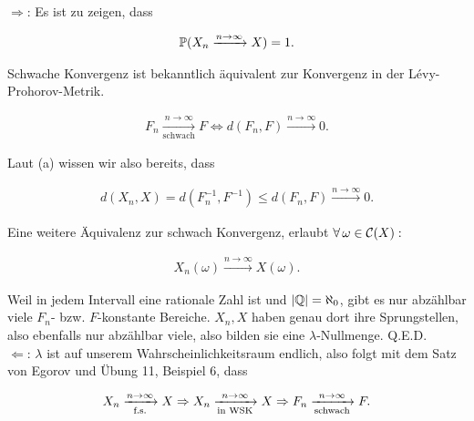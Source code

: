 \begin{solution}
$\Rightarrow$: Es ist zu zeigen, dass

\begin{align*}
  \P(X_n \xrightarrow{n \to \infty} X) = 1.
\end{align*}

Schwache Konvergenz ist bekanntlich äquivalent zur Konvergenz in der Lévy-Prohorov-Metrik.

\begin{align*}
  F_n \xrightarrow[\text{schwach}]{n \to \infty} F
  \Leftrightarrow
  d(F_n, F) \xrightarrow{n \to \infty} 0.
\end{align*}

Laut (a) wissen wir also bereits, dass

\begin{align*}
  d(X_n, X) =
  d(F_n^{-1}, F^{-1}) \leq
  d(F_n, F) \xrightarrow{n \to \infty} 0.
  \label{schwache_konvergenz}
\end{align*}

Eine weitere Äquivalenz zur schwach Konvergenz, erlaubt $\Forall \omega \in \mathcal{C}(X):$

\begin{align*}
  X_n(\omega) \xrightarrow{n \to \infty} X(\omega).
\end{align*}

Weil in jedem Intervall eine rationale Zahl ist und $|\Q| = \aleph_0$, gibt es nur abzählbar viele $F_n$- bzw. $F$-konstante Bereiche. $X_n, X$ haben genau dort ihre Sprungstellen, also ebenfalls nur abzählbar viele, also bilden sie eine $\lambda$-Nullmenge. Q.E.D. \\

$\Leftarrow$: $\lambda$ ist auf unserem Wahrscheinlichkeitsraum endlich, also folgt mit dem Satz von Egorov und Übung 11, Beispiel 6, dass

\begin{align*}
  X_n \xrightarrow[\fastsicher]{n \to \infty} X
  \Rightarrow
  X_n \xrightarrow[\text{in WSK}]{n \to \infty} X
  \Rightarrow
  F_n \xrightarrow[\text{schwach}]{n \to \infty} F.
\end{align*}

\end{solution}

